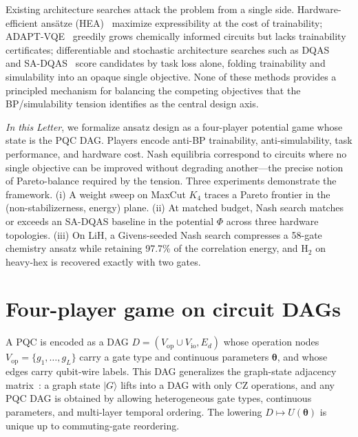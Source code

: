 \documentclass[prl,twocolumn,aps,superscriptaddress,showkeys,floatfix,nofootinbib]{revtex4-2}
\begin{document}
Existing architecture searches attack the problem from a single side. Hardware-efficient ans\"atze (HEA)~\cite{kandala2017hea} maximize expressibility at the cost of trainability; ADAPT-VQE~\cite{grimsley2019adapt} greedily grows chemically informed circuits but lacks trainability certificates; differentiable and stochastic architecture searches such as DQAS~\cite{zhang2022dqas} and SA-DQAS~\cite{wang2024sadqas} score candidates by task loss alone, folding trainability and simulability into an opaque single objective. None of these methods provides a principled mechanism for balancing the competing objectives that the BP/simulability tension identifies as the central design axis.

\emph{In this Letter}, we formalize ansatz design as a four-player potential game whose state is the PQC DAG. Players encode anti-BP trainability, anti-simulability, task performance, and hardware cost. Nash equilibria correspond to circuits where no single objective can be improved without degrading another---the precise notion of Pareto-balance required by the tension. Three experiments demonstrate the framework. (i) A weight sweep on MaxCut $K_4$ traces a Pareto frontier in the (non-stabilizerness, energy) plane. (ii) At matched budget, Nash search matches or exceeds an SA-DQAS baseline in the potential $\Phi$ across three hardware topologies. (iii) On LiH, a Givens-seeded Nash search compresses a 58-gate chemistry ansatz while retaining 97.7\% of the correlation energy, and H$_2$ on heavy-hex is recovered exactly with two gates.

\section{Four-player game on circuit DAGs}

A PQC is encoded as a DAG $D=(V_\text{op}\cup V_\text{io}, E_d)$ whose operation nodes $V_\text{op}=\{g_1,\ldots,g_L\}$ carry a gate type and continuous parameters $\bm\theta$, and whose edges carry qubit-wire labels. This DAG generalizes the graph-state adjacency matrix~\cite{hein2004graphstates,raussendorf2001oneway}: a graph state $|G\rangle$ lifts into a DAG with only $\text{CZ}$ operations, and any PQC DAG is obtained by allowing heterogeneous gate types, continuous parameters, and multi-layer temporal ordering. The lowering $D\mapsto U(\bm\theta)$ is unique up to commuting-gate reordering.
\end{document}
